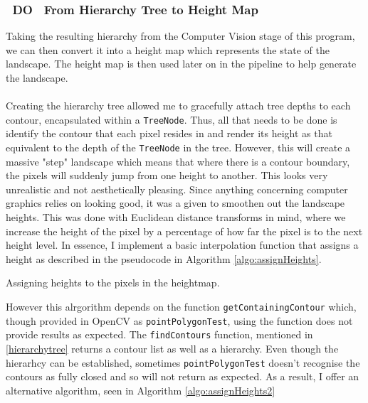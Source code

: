 \documentclass[11pt]{article}
\begin{document}
\subsubsection{~DO~ From Hierarchy Tree to Height Map}
Taking the resulting hierarchy from the Computer Vision stage of this
program, we can then convert it into a height map which represents the
state of the landscape. The height map is then used later on in the pipeline
to help generate the landscape.\\
\\
Creating the hierarchy tree allowed me to gracefully attach tree
depths to each contour, encapsulated within a \texttt{TreeNode}. Thus,
all that needs to be done is identify the contour that each pixel resides
in and render its height as that equivalent to the depth of the 
\texttt{TreeNode} in the tree. However, this will create a massive "step"
landscape which means that where there is a contour boundary, the
pixels will suddenly jump from one height to another. This looks very
unrealistic and not aesthetically pleasing. Since anything concerning
computer graphics relies on looking good, it was a given to smoothen out
the landscape heights. This was done with Euclidean distance transforms 
in mind, where we increase the height of the pixel by a percentage of how
far the pixel is to the next height level. In essence, I implement a 
basic interpolation function that assigns a height as described in the 
pseudocode in Algorithm \ref{algo:assignHeights}.

\begin{algorithm}
\DontPrintSemicolon
{}
\caption{Assigning heights to the pixels in the heightmap.}
\label{algo:assignHeights}
\end{algorithm}

However this alrgorithm depends on the function \texttt{getContainingContour}
which, though provided in OpenCV as \texttt{pointPolygonTest}, using
the function does not provide results as expected. The \texttt{findContours}
function, mentioned in \ref{hierarchytree} returns a contour list as
well as a hierarchy. Even though the hierarhcy can be established, sometimes
\texttt{pointPolygonTest} doesn't recognise the contours as fully closed and
so will not return as expected. As a result, I offer an alternative 
algorithm, seen in Algorithm \ref{algo:assignHeights2}
\end{document}
